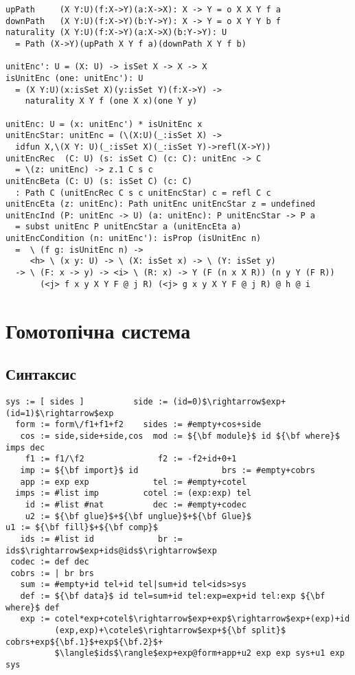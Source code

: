 \begin{lstlisting}[mathescape=true]
upPath     (X Y:U)(f:X->Y)(a:X->X): X -> Y = o X X Y f a
downPath   (X Y:U)(f:X->Y)(b:Y->Y): X -> Y = o X Y Y b f
naturality (X Y:U)(f:X->Y)(a:X->X)(b:Y->Y): U
  = Path (X->Y)(upPath X Y f a)(downPath X Y f b)

unitEnc': U = (X: U) -> isSet X -> X -> X
isUnitEnc (one: unitEnc'): U
  = (X Y:U)(x:isSet X)(y:isSet Y)(f:X->Y) ->
    naturality X Y f (one X x)(one Y y)

unitEnc: U = (x: unitEnc') * isUnitEnc x
unitEncStar: unitEnc = (\(X:U)(_:isSet X) ->
  idfun X,\(X Y: U)(_:isSet X)(_:isSet Y)->refl(X->Y))
unitEncRec  (C: U) (s: isSet C) (c: C): unitEnc -> C
  = \(z: unitEnc) -> z.1 C s c
unitEncBeta (C: U) (s: isSet C) (c: C)
  : Path C (unitEncRec C s c unitEncStar) c = refl C c
unitEncEta (z: unitEnc): Path unitEnc unitEncStar z = undefined
unitEncInd (P: unitEnc -> U) (a: unitEnc): P unitEncStar -> P a
  = subst unitEnc P unitEncStar a (unitEncEta a)
unitEncCondition (n: unitEnc'): isProp (isUnitEnc n)
  =  \ (f g: isUnitEnc n) ->
     <h> \ (x y: U) -> \ (X: isSet x) -> \ (Y: isSet y)
  -> \ (F: x -> y) -> <i> \ (R: x) -> Y (F (n x X R)) (n y Y (F R))
       (<j> f x y X Y F @ j R) (<j> g x y X Y F @ j R) @ h @ i
\end{lstlisting}

\newpage
\section{Гомотопічна система}

\subsection{Синтаксис}


\begin{lstlisting}[mathescape=true]
   sys := [ sides ]          side := (id=0)$\rightarrow$exp+(id=1)$\rightarrow$exp
  form := form\/f1+f1+f2    sides := #empty+cos+side
   cos := side,side+side,cos  mod := ${\bf module}$ id ${\bf where}$ imps dec
    f1 := f1/\f2               f2 := -f2+id+0+1
   imp := ${\bf import}$ id                 brs := #empty+cobrs
   app := exp exp             tel := #empty+cotel
  imps := #list imp         cotel := (exp:exp) tel
    id := #list #nat          dec := #empty+codec
    u2 := ${\bf glue}$+${\bf unglue}$+${\bf Glue}$                   u1 := ${\bf fill}$+${\bf comp}$
   ids := #list id             br := ids$\rightarrow$exp+ids@ids$\rightarrow$exp
 codec := def dec
 cobrs := | br brs
   sum := #empty+id tel+id tel|sum+id tel<ids>sys   
   def := ${\bf data}$ id tel=sum+id tel:exp=exp+id tel:exp ${\bf where}$ def
   exp := cotel*exp+cotel$\rightarrow$exp+exp$\rightarrow$exp+(exp)+id
          (exp,exp)+\cotele$\rightarrow$exp+${\bf split}$ cobrs+exp${\bf.1}$+exp${\bf.2}$+
          $\langle$ids$\rangle$exp+exp@form+app+u2 exp exp sys+u1 exp sys
\end{lstlisting}

